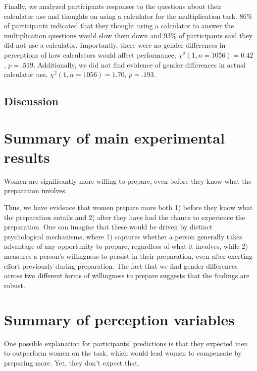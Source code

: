 \documentclass[a4paper,nobind]{templates/ociamthesis}
\begin{document}
Finally, we analyzed participants responses to the questions about their calculator use and thoughts on using a calculator for the multiplication task. 86\% of participants indicated that they thought using a calculator to answer the multiplication questions would slow them down and 93\% of participants said they did not use a calculator. Importantly, there were no gender differences in perceptions of how calculators would affect performance, \(\chi^2(1, n = 1056) = 0.42\), \(p = .519\). Additionally, we did not find evidence of gender differences in actual calculator use, \(\chi^2(1, n = 1056) = 1.70\), \(p = .193\).

\hypertarget{discussion}{%
\subsection{Discussion}\label{discussion}}

\hypertarget{summary-of-main-experimental-results}{%
\section{Summary of main experimental results}\label{summary-of-main-experimental-results}}

Women are significantly more willing to prepare, even before they know what the preparation involves.

Thus, we have evidence that women prepare more both 1) before they know what the preparation entails and 2) after they have had the chance to experience the preparation. One can imagine that these would be driven by distinct psychological mechanisms, where 1) captures whether a person generally takes advantage of any opportunity to prepare, regardless of what it involves, while 2) measures a person's willingness to persist in their preparation, even after exerting effort previously during preparation. The fact that we find gender differences across two different forms of willingness to prepare suggests that the findings are robust.

\hypertarget{summary-of-perception-variables}{%
\section{Summary of perception variables}\label{summary-of-perception-variables}}

One possible explanation for participants' predictions is that they expected men to outperform women on the task, which would lead women to compensate by preparing more. Yet, they don't expect that.
\end{document}
